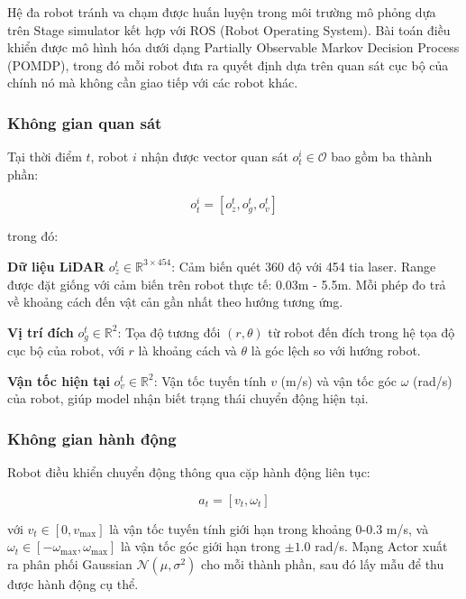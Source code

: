 Hệ đa robot tránh va chạm được huấn luyện trong môi trường mô phỏng dựa trên Stage simulator kết hợp với ROS (Robot Operating System). Bài toán điều khiển được mô hình hóa dưới dạng Partially Observable Markov Decision Process (POMDP), trong đó mỗi robot đưa ra quyết định dựa trên quan sát cục bộ của chính nó mà không cần giao tiếp với các robot khác.

\subsubsection{Không gian quan sát}

Tại thời điểm $t$, robot $i$ nhận được vector quan sát $o_t^i \in \mathcal{O}$ bao gồm ba thành phần:

\begin{equation}
o_t^i = [o_z^t, o_g^t, o_v^t]
\label{eq:observation}
\end{equation}

trong đó:

\textbf{Dữ liệu LiDAR} $o_z^t \in \mathbb{R}^{3 \times 454}$: Cảm biến quét 360 độ với 454 tia laser. Range được đặt giống với cảm biến trên robot thực tế: 0.03m - 5.5m. Mỗi phép đo trả về khoảng cách đến vật cản gần nhất theo hướng tương ứng.

\textbf{Vị trí đích} $o_g^t \in \mathbb{R}^2$: Tọa độ tương đối $(r, \theta)$ từ robot đến đích trong hệ tọa độ cục bộ của robot, với $r$ là khoảng cách và $\theta$ là góc lệch so với hướng robot.

\textbf{Vận tốc hiện tại} $o_v^t \in \mathbb{R}^2$: Vận tốc tuyến tính $v$ (m/s) và vận tốc góc $\omega$ (rad/s) của robot, giúp model nhận biết trạng thái chuyển động hiện tại.

\subsubsection{Không gian hành động}

Robot điều khiển chuyển động thông qua cặp hành động liên tục:

\begin{equation}
a_t = [v_t, \omega_t]
\label{eq:action}
\end{equation}

với $v_t \in [0, v_{\max}]$ là vận tốc tuyến tính giới hạn trong khoảng 0-0.3 m/s, và $\omega_t \in [-\omega_{\max}, \omega_{\max}]$ là vận tốc góc giới hạn trong $\pm 1.0$ rad/s. Mạng Actor xuất ra phân phối Gaussian $\mathcal{N}(\mu, \sigma^2)$ cho mỗi thành phần, sau đó lấy mẫu để thu được hành động cụ thể.

